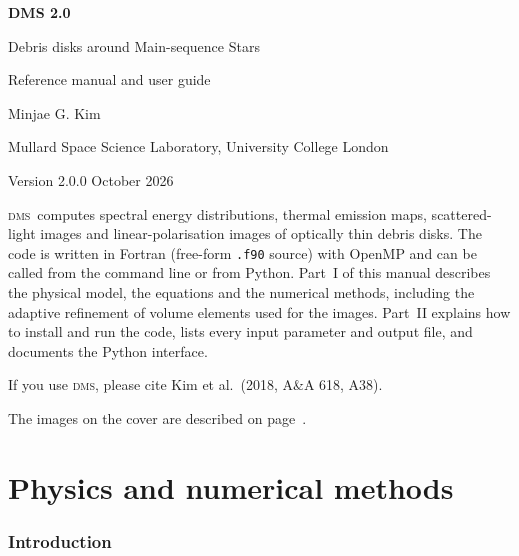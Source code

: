 \documentclass[11pt,a4paper]{article}
\newcommand{\dms}{\textsc{dms}}
\newcommand{\code}[1]{\texttt{#1}}
\begin{document}
\begin{titlepage}
\centering
\vspace*{3cm}
{\Huge\bfseries DMS 2.0\par}
\vspace{0.4cm}
{\Large Debris disks around Main-sequence Stars\par}
\vspace{1.2cm}
{\large Reference manual and user guide\par}
\vspace{2cm}
{\large Minjae G. Kim\par}
\vspace{0.2cm}
{\normalsize Mullard Space Science Laboratory, University College London\par}
\vspace{2.5cm}
{\normalsize Version 2.0.0 \quad\textbullet\quad October 2026\par}
\vfill
\begin{minipage}{0.82\textwidth}
\small
\dms\ computes spectral energy distributions, thermal emission maps, scattered-light images and
linear-polarisation images of optically thin debris disks. The code is written in Fortran
(free-form \code{.f90} source) with OpenMP and can be called from the command line or from
Python. Part~I of this manual
describes the physical model, the equations and the numerical methods, including the adaptive
refinement of volume elements used for the images. Part~II explains how to install and run the
code, lists every input parameter and output file, and documents the Python interface.

\medskip
If you use \dms, please cite Kim et al.\ (2018, A\&A 618, A38).

\medskip
The images on the cover are described on page~\pageref{sec:cover}.
\end{minipage}
\end{titlepage}

\tableofcontents
\newpage

\part{Physics and numerical methods}

\section{Introduction}
\label{sec:intro}
\end{document}
